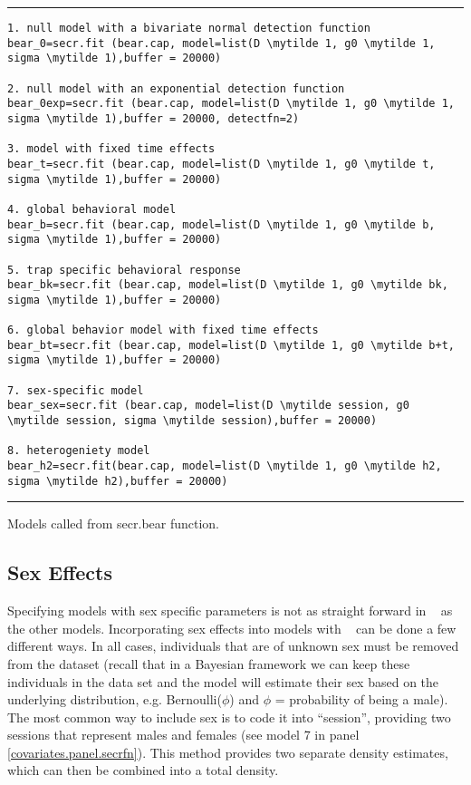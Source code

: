 \begin{panel}[htp]
\centering
\rule[0.1in]{\textwidth}{.03in}
{\small
\begin{Verbatim}[commandchars=\\\{\}]
1. null model with a bivariate normal detection function
bear_0=secr.fit (bear.cap, model=list(D \mytilde 1, g0 \mytilde 1, sigma \mytilde 1),buffer = 20000)

2. null model with an exponential detection function
bear_0exp=secr.fit (bear.cap, model=list(D \mytilde 1, g0 \mytilde 1, sigma \mytilde 1),buffer = 20000, detectfn=2)

3. model with fixed time effects
bear_t=secr.fit (bear.cap, model=list(D \mytilde 1, g0 \mytilde t, sigma \mytilde 1),buffer = 20000)

4. global behavioral model
bear_b=secr.fit (bear.cap, model=list(D \mytilde 1, g0 \mytilde b, sigma \mytilde 1),buffer = 20000)

5. trap specific behavioral response
bear_bk=secr.fit (bear.cap, model=list(D \mytilde 1, g0 \mytilde bk, sigma \mytilde 1),buffer = 20000)

6. global behavior model with fixed time effects
bear_bt=secr.fit (bear.cap, model=list(D \mytilde 1, g0 \mytilde b+t, sigma \mytilde 1),buffer = 20000)

7. sex-specific model
bear_sex=secr.fit (bear.cap, model=list(D \mytilde session, g0 \mytilde session, sigma \mytilde session),buffer = 20000)

8. heterogeniety model
bear_h2=secr.fit(bear.cap, model=list(D \mytilde 1, g0 \mytilde h2, sigma \mytilde h2),buffer = 20000)
\end{Verbatim}
}

\rule[-0.1in]{\textwidth}{.03in}
\caption{
Models called from secr.bear function. }
\label{covariates.panel.secrfn}
\end{panel}




\subsection{Sex Effects}

Specifying models with sex specific parameters is not as straight forward in \secr~ as the other models. 
Incorporating sex effects into models with \secr~ can be done a few
different ways.  In all cases, individuals that
are of unknown sex must be removed from the dataset (recall that in a Bayesian framework we can keep these individuals in the data set and the model will estimate their sex based on the underlying distribution, e.g. {\mbox Bernoulli($\phi$)} and $\phi$ = probability of being a male).
The most common way to include
sex is to code it into ``session'', providing two sessions that
represent males and females (see model 7 in 
panel \ref{covariates.panel.secrfn}).  This method provides two separate density
estimates, which can then be combined into a total density.  

